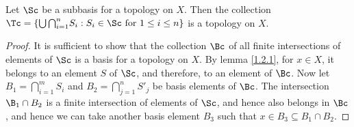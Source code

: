 \begin{theorem}\label{1.2.5}
    Let $\Sc$ be a subbasis for a topology on  $X$. Then the collection $\Tc=\{\bigcup{\bigcap_{i=1}^{n}}{S_i}: 
    S_i \in \Sc \text{ for } 1 \leq i \leq n\}$ is a topology on $X$.
\end{theorem}
\begin{proof}
    It is sufficient to show that the collection $\Bc$ of all finite intersections of elements 
    of $\Sc$ is a basis for a topology on  $X$. By lemma \ref{1.2.1}, for $x \in X$, it belongs to 
    an element  $S$ of  $\Sc$, and therefore, to an element of  $\Bc$. Now let  $B_1=\bigcap_{i=1}^m{S_i}$ 
    and $B_2=\bigcap_{j=1}^{n}{S'_j}$ be basis elements of $\Bc$. The intersection  $\B_1 \cap B_2$ is a 
    finite intersection of elements of $\Sc$, and hence also belongs in  $\Bc$, and hence we can take 
    another basis element  $B_3$ such that $x \in B_3 \subseteq B_1 \cap B_2$.
\end{proof}
